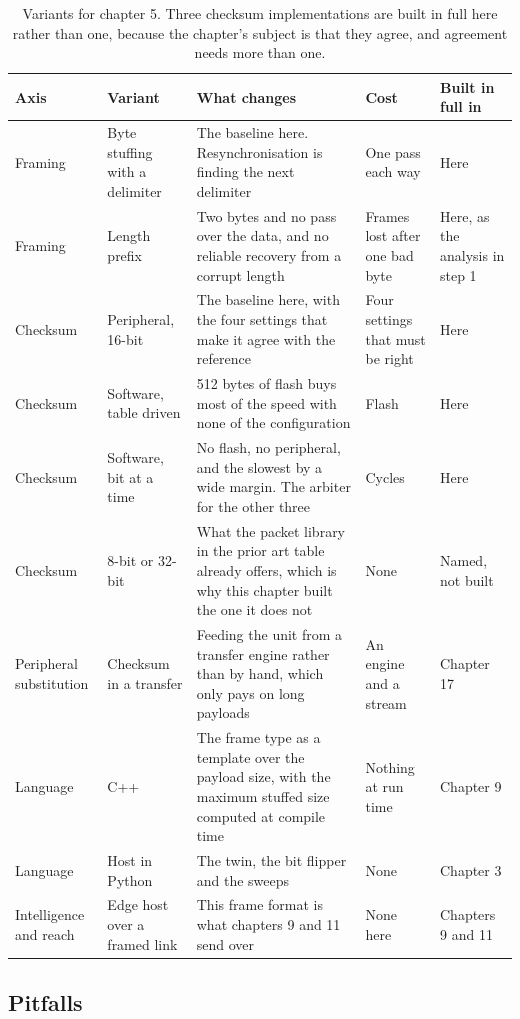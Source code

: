 \begin{table}[H]\centering\small
\begin{tabular}{p{24mm}p{26mm}p{44mm}p{22mm}p{20mm}}
\toprule
Axis & Variant & What changes & Cost & Built in full in \\
\midrule
Framing & Byte stuffing with a delimiter & The baseline here. Resynchronisation is finding the next delimiter & One pass each way & Here \\
Framing & Length prefix & Two bytes and no pass over the data, and no reliable recovery from a corrupt length & Frames lost after one bad byte & Here, as the analysis in step 1 \\
Checksum & Peripheral, 16-bit & The baseline here, with the four settings that make it agree with the reference & Four settings that must be right & Here \\
Checksum & Software, table driven & 512 bytes of flash buys most of the speed with none of the configuration & Flash & Here \\
Checksum & Software, bit at a time & No flash, no peripheral, and the slowest by a wide margin. The arbiter for the other three & Cycles & Here \\
Checksum & 8-bit or 32-bit & What the packet library in the prior art table already offers, which is why this chapter built the one it does not & None & Named, not built \\
Peripheral substitution & Checksum in a transfer & Feeding the unit from a transfer engine rather than by hand, which only pays on long payloads & An engine and a stream & Chapter 17 \\
Language & C++ & The frame type as a template over the payload size, with the maximum stuffed size computed at compile time & Nothing at run time & Chapter 9 \\
Language & Host in Python & The twin, the bit flipper and the sweeps & None & Chapter 3 \\
Intelligence and reach & Edge host over a framed link & This frame format is what chapters 9 and 11 send over & None here & Chapters 9 and 11 \\
\bottomrule
\end{tabular}
\caption{Variants for chapter 5. Three checksum implementations are built in full here rather than one, because the chapter's subject is that they agree, and agreement needs more than one.}
\end{table}

\subsection*{Pitfalls}

